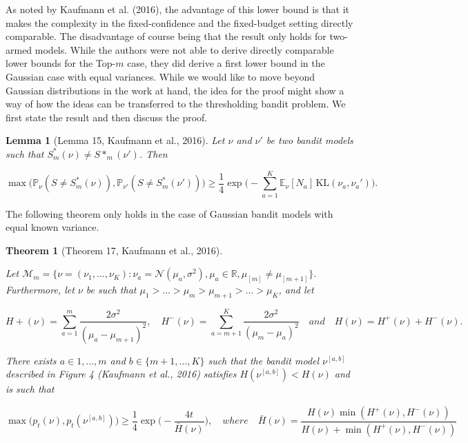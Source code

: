 \documentclass[12pt,]{article}
\newtheorem{theorem}{Theorem}
\newtheorem{lemma}{Lemma}
\newcommand{\KL}{\,\text{KL}}
\begin{document}
As noted by Kaufmann et al. (2016), the advantage of this lower bound is
that it makes the complexity in the fixed-confidence and the
fixed-budget setting directly comparable. The disadvantage of course
being that the result only holds for two-armed models. While the authors
were not able to derive directly comparable lower bounds for the
Top-\(m\) case, they did derive a first lower bound in the Gaussian case
with equal variances. While we would like to move beyond Gaussian
distributions in the work at hand, the idea for the proof might show a
way of how the ideas can be transferred to the thresholding bandit
problem. We first state the result and then discuss the proof.

\begin{lemma}[Lemma 15, Kaufmann et al., 2016] \label{theorem:KaufmannEtAlLemma15}
Let $\nu$ and $\nu'$ be two bandit models such that $S^*_m(\nu) \neq S*_m(\nu')$. Then

\begin{equation*}
\max \big( \mathbb{P}_{\nu}(S \neq S^*_m(\nu)), \mathbb{P}_{\nu'}(S \neq S^*_m(\nu')) \big) \geq \frac{1}{4} \exp \Big(-\sum_{a=1}^{K} \mathbb{E}_{\nu}[N_a] \KL(\nu_a, \nu_a') \Big).
\end{equation*}
\end{lemma}

The following theorem only holds in the case of Gaussian bandit models
with equal known variance.

\begin{theorem}[Theorem 17, Kaufmann et al., 2016] \label{theorem:KaufmannEtAlTheorem17}

Let $\mathcal{M}_m = \{\nu = (\nu_1, \dots, \nu_K): \nu_a = \mathcal{N}(\mu_a, \sigma^2), \mu_a \in \mathbb{R}, \mu_{[m]}\neq \mu_{[m+1]}\}.$ Furthermore, let $\nu$ be such that $\mu_1 > \dots > \mu_m > \mu_{m+1} > \dots > \mu_K$, and let

\begin{equation*}
H +(\nu) = \sum_{a=1}^m \frac{2\sigma^2}{(\mu_a - \mu_{m+1})^2}, \quad H^-(\nu) = \sum_{a=m+1}^K \frac{2\sigma^2}{(\mu_m - \mu_a)^2} \quad
and \quad
H(\nu) = H^+(\nu) + H^-(\nu).
\end{equation*}

There exists $a \in {1, \dots, m}$ and $b \in \{m+1, \dots, K\}$ such that the bandit model $\nu^{[a,b]}$ described in Figure 4 (Kaufmann et al., 2016) satisfies $H(\nu^{[a,b]}) < H(\nu)$ and is such that

\begin{equation*}
\max \big( p_t(\nu),p_t(\nu^{[a,b]})\big) \geq \frac{1}{4} \exp \big(-\frac{4t}{\bar{H}(\nu)}\big), \quad where \quad \bar{H}(\nu) = \frac{H(\nu) \min(H^+(\nu),H^-(\nu))}{H(\nu)+\min(H^+(\nu),H^-(\nu))}
\end{equation*}
\end{theorem}
\end{document}
